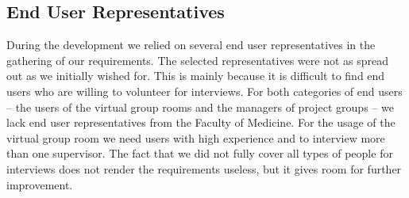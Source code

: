 \subsection{End User Representatives}
During the development we relied on several end user representatives in the gathering of our requirements.
The selected representatives were not as spread out as we initially wished for. 
This is mainly because it is difficult to find end users who are willing to volunteer for interviews. 
For both categories of end users -- the users of the virtual group rooms and the managers of project groups -- we lack end user representatives from the Faculty of Medicine.
For the usage of the virtual group room we need users with high experience and to interview more than one supervisor.
The fact that we did not fully cover all types of people for interviews does not render the requirements useless, but it gives room for further improvement.